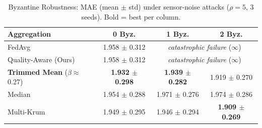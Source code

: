 
\begin{table}[htbp]
\centering
\caption{Byzantine Robustness: MAE (mean $\pm$ std) under sensor-noise attacks ($\rho=5$, 3 seeds). Bold = best per column.}
\label{tab:byzantine}
\begin{tabular}{lccc}
\toprule
\textbf{Aggregation} & \textbf{0 Byz.} & \textbf{1 Byz.} & \textbf{2 Byz.} \\
\midrule
FedAvg & 1.958 $\pm$ 0.312 & \multicolumn{2}{c}{\textit{catastrophic failure} ($\infty$)} \\
Quality-Aware (Ours) & 1.958 $\pm$ 0.312 & \multicolumn{2}{c}{\textit{catastrophic failure} ($\infty$)} \\
\textbf{Trimmed Mean} ($\beta$$\approx$0.27) & \textbf{1.932 $\pm$ 0.298} & \textbf{1.939 $\pm$ 0.282} & 1.919 $\pm$ 0.270 \\
Median & 1.954 $\pm$ 0.288 & 1.971 $\pm$ 0.276 & 1.974 $\pm$ 0.286 \\
Multi-Krum & 1.949 $\pm$ 0.295 & 1.946 $\pm$ 0.294 & \textbf{1.909 $\pm$ 0.269} \\
\bottomrule
\end{tabular}
\end{table}
